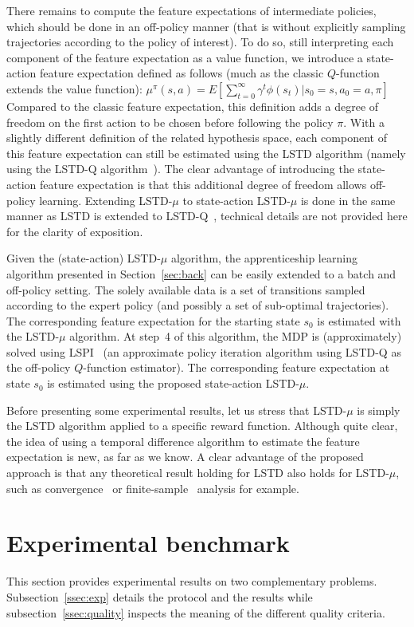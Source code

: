 \documentclass{llncs}
\begin{document}
There remains to compute the feature expectations of intermediate
policies, which should be done in an off-policy manner (that is
without explicitly sampling trajectories according to the policy of
interest). To do so, still interpreting each component of the
feature expectation as a value function, we introduce a state-action
feature expectation defined as follows (much as the classic
$Q$-function extends the value function):
$\mu^\pi(s,a) = E[\sum\limits_{t=0}^\infty \gamma^t
  \phi(s_t)|s_0=s,a_0=a,\pi]$
Compared to the classic feature expectation, this definition adds a
degree of freedom on the first action to be chosen before following
the policy $\pi$. With a slightly different definition of the
related hypothesis space, each component of this feature expectation
can still be estimated using the LSTD algorithm (namely using the
LSTD-Q algorithm~\citep{lagoudakis2003least}). The clear advantage of
introducing the state-action feature expectation is that this
additional degree of freedom allows off-policy learning.
Extending LSTD-$\mu$ to state-action LSTD-$\mu$ is done in the same
manner as LSTD is extended to LSTD-Q~\citep{lagoudakis2003least},
technical details are not provided here for the clarity of
exposition.

Given the (state-action) LSTD-$\mu$ algorithm, the apprenticeship
learning algorithm presented in Section~\ref{sec:back} can be easily extended to a batch and
off-policy setting. The solely available data is a set of
transitions sampled according to the expert policy  (and possibly a set of sub-optimal trajectories). The
corresponding feature expectation for the starting state $s_0$ is
estimated with the LSTD-$\mu$ algorithm. At step~4 of this
algorithm, the MDP is (approximately) solved using
LSPI~\citep{lagoudakis2003least} (an approximate policy iteration
algorithm using LSTD-Q as the off-policy $Q$-function estimator).
The corresponding feature expectation at state $s_0$ is estimated
using the proposed state-action LSTD-$\mu$.

Before presenting some experimental results, let us stress that
LSTD-$\mu$ is simply the LSTD algorithm applied to a specific reward
function. Although quite clear, the idea of using a temporal
difference algorithm to estimate the feature expectation is new, as
far as we know. A clear advantage of the proposed approach is that
any theoretical result holding for LSTD also holds for LSTD-$\mu$,
such as convergence~\citep{nedic2003least} or
finite-sample~\citep{lazaric2010finiteLSTD} analysis for example.
\section{Experimental benchmark}
\label{sec:exp}
This section provides experimental results on two complementary problems. Subsection~\ref{ssec:exp} details the protocol and the results while subsection~\ref{ssec:quality} inspects the meaning of the different quality criteria. 
\end{document}
